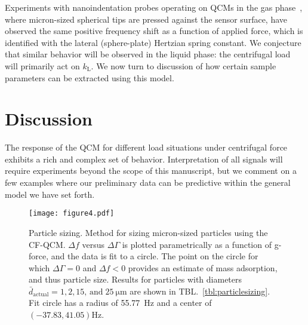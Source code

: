 \documentclass[floatfix,superscriptaddress,a4paper,twocolumn]{revtex4-1}
\newcommand{\Table}[1]{TBL.~\ref{#1}}
\newcommand{\df}{\Delta\!f}
\newcommand{\dg}{\Delta\Gamma}
\newcommand{\kl}{k_\mathrm{L}}
\begin{document}

Experiments with nanoindentation probes operating on QCMs in the gas
phase~\cite{borovsky2001measuring}, where micron-sized spherical tips are
pressed against the sensor surface, have observed the same positive
frequency shift as a function of applied force,  which is identified with
the lateral (sphere-plate) Hertzian spring constant.  We conjecture that
similar behavior will be observed in the liquid phase: the centrifugal load
will primarily act on $\kl$.  We now turn to discussion of how certain
sample parameters can be extracted using this model.

\section*{Discussion}
\label{sec:discussion}
The response of the QCM for different load situations under centrifugal
force exhibits a rich and complex set of behavior. Interpretation of all
signals will require experiments beyond the scope of this
manuscript, but we comment on a few examples where our
preliminary data can be predictive within the general model we have set forth.

\begin{figure}[ht]
\centering
\texttt{[image: figure4.pdf]}
\caption{ Particle sizing.  Method for sizing micron-sized particles using the CF-QCM.
$\df$ versus $\dg$ is plotted parametrically as a function of g-force, and
the data is fit to a circle.  The point on the circle for which $\dg=0$ and
$\df<0$ provides an estimate of mass adsorption, and thus particle size.
Results for particles with diameters $\bar{d}_\mathrm{actual}=1, 2,
15,\,\mathrm{and}\;\SI{25}{\micro\meter}$ are shown in
\Table{tbl:particlesizing}.  Fit circle has a radius of \SI{55.77}{\hertz} and
a center of $(-37.83,41.05) \si{\hertz}$. }
\label{fig:circlefit}
\end{figure}
\end{document}
